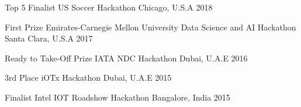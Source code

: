 



\begin{cvhonors}

  \cvhonor
    {Top 5 Finalist} %
    {US Soccer Hackathon} %
    {Chicago, U.S.A} %
    {2018} %

  \cvhonor
    {First Prize} %
    {Emirates-Carnegie Mellon University Data Science and AI Hackathon} %
    {Santa Clara, U.S.A} %
    {2017} %

  \cvhonor
    {Ready to Take-Off Prize} %
    {IATA NDC Hackathon} %
    {Dubai, U.A.E} %
    {2016} %

  \cvhonor
    {3rd Place} %
    {iOTx Hackathon} %
    {Dubai, U.A.E} %
    {2015} %

  \cvhonor
    {Finalist} %
    {Intel IOT Roadshow Hackathon} %
    {Bangalore, India} %
    {2015} %

\end{cvhonors}

